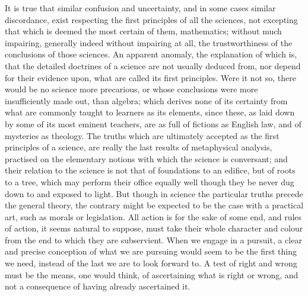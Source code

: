 \documentclass[12pt]{report}
\begin{document}
It is true that similar confusion and uncertainty, and in some cases similar discordance, exist respecting the first principles of all the sciences, not excepting that which is deemed the most certain of them, mathematics; without much impairing, generally indeed without impairing at all, the trustworthiness of the conclusions of those sciences. An apparent anomaly, the explanation of which is, that the detailed doctrines of a science are not usually deduced from, nor depend for their evidence upon, what are called its first principles. Were it not so, there would be no science more precarious, or whose conclusions were more insufficiently made out, than algebra; which derives none of its certainty from what are commonly taught to learners as its elements, since these, as laid down by some of its most eminent teachers, are as full of fictions as English law, and of mysteries as theology. The truths which are ultimately accepted as the first principles of a science, are really the last results of metaphysical analysis, practised on the elementary notions with which the science is conversant; and their relation to the science is not that of foundations to an edifice, but of roots to a tree, which may perform their office equally well though they be never dug down to and exposed to light. But though in science the particular truths precede the general theory, the contrary might be expected to be the case with a practical art, such as morals or legislation. All action is for the sake of some end, and rules of action, it seems natural to suppose, must take their whole character and colour from the end to which they are subservient. When we engage in a pursuit, a clear and precise conception of what we are pursuing would seem to be the first thing we need, instead of the last we are to look forward to. A test of right and wrong must be the means, one would think, of ascertaining what is right or wrong, and not a consequence of having already ascertained it.
\end{document}
